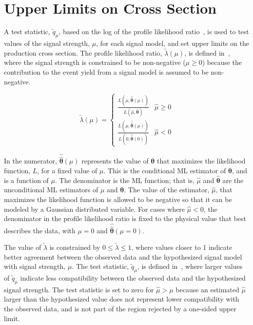 %
\section{Upper Limits on Cross Section}
\label{ch:stats:ul}
A test statistic, $\tilde{q}_{\mu}$, based on the log of the profile likelihood ratio~\cite{lh_stats}, is used to test values of the signal strength, $\mu$, for each signal model, and set upper limits on the production cross section. The profile likelihood ratio, $\tilde{\lambda}(\mu)$, is defined in~\Eqn{\ref{eq:plr}}, where the signal strength is constrained to be non-negative ($\mu\geq0$) because the contribution to the event yield from a signal model is assumed to be non-negative.

\begin{equation}
\tilde{\lambda}(\mu)=\begin{cases} \frac{L(\mu,\hat{\hat{\bm{\theta}}}(\mu))}{L(\hat{\mu},\hat{\bm{\theta}})}&\hat{\mu}\geq 0 \\ \frac{L(\mu,\hat{\hat{\bm{\theta}}}(\mu))}{L(0,\hat{\hat{\bm{\theta}}}(0))} & \hat{\mu}< 0 \end{cases}
\label{eq:plr}
\end{equation}

In the numerator, $\hat{\hat{\bm{\theta}}}(\mu)$ represents the value of $\bm{\theta}$ that maximizes the likelihood function, $L$, for a fixed value of $\mu$. This is the conditional ML estimator of $\bm{\theta}$, and is a function of $\mu$. The denominator is the ML function; that is, $\hat{\mu}$ and $\hat{\bm{\theta}}$ are the unconditional ML estimators of $\mu$ and $\bm{\theta}$. The value of the estimator, $\hat{\mu}$, that maximizes the likelihood function is allowed to be negative so that it can be modeled by a Gaussian distributed variable. For cases where $\hat{\mu}<0$, the denominator in the profile likelihood ratio is fixed to the physical value that best describes the data, with $\mu=0$ and $\hat{\hat{\bm{\theta}}}(\mu=0)$.

The value of $\tilde{\lambda}$ is constrained by $0\leq\tilde{\lambda}\leq 1$, where values closer to 1 indicate better agreement between the observed data and the hypothesized signal model with signal strength, $\mu$. The test statistic, $\tilde{q}_{\mu}$, is defined in~\Eqn{\ref{eq:qmu}}, where larger values of $\tilde{q}_{\mu}$ indicate less compatibility between the observed data and the hypothesized signal strength. The test statistic is set to zero for $\hat{\mu}>\mu$ because an estimated $\hat{\mu}$ larger than the hypothesized value does not represent lower compatibility with the observed data, and is not part of the region rejected by a one-sided upper limit. 

